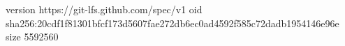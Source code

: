 version https://git-lfs.github.com/spec/v1
oid sha256:20cdf1f81301bfcf173d5607fae272db6ec0ad4592f585c72dadb1954146e96e
size 5592560
